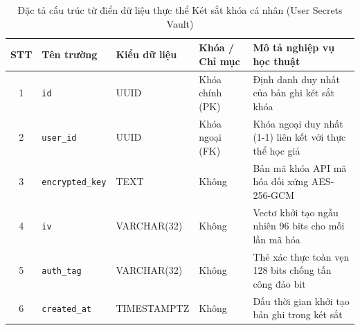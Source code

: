 \begin{table}[htbp]
\centering
\singlespacing
\small
\renewcommand{\arraystretch}{1.2}
\caption{Đặc tả cấu trúc từ điển dữ liệu thực thể Két sắt khóa cá nhân (User Secrets Vault)}
\label{tab:user_secrets}
\setlength{\tabcolsep}{3.5pt}
\begin{tabular}{|c|>{\raggedright\arraybackslash}p{3.4cm}|>{\raggedright\arraybackslash}p{2.9cm}|>{\raggedright\arraybackslash}p{2.2cm}|>{\raggedright\arraybackslash}p{4.3cm}|}
\hline
\textbf{STT} & \centering\textbf{Tên trường} & \centering\textbf{Kiểu dữ liệu} & \centering\textbf{Khóa / Chỉ mục} & \centering\textbf{Mô tả nghiệp vụ học thuật} \tabularnewline \hline
1 & \texttt{id} & UUID & Khóa chính (PK) & Định danh duy nhất của bản ghi két sắt khóa \\ \hline
2 & \texttt{user\_id} & UUID & Khóa ngoại (FK) & Khóa ngoại duy nhất (1-1) liên kết với thực thể học giả \\ \hline
3 & \texttt{encrypted\_key} & TEXT & Không & Bản mã khóa API mã hóa đối xứng AES-256-GCM \\ \hline
4 & \texttt{iv} & VARCHAR(32) & Không & Vectơ khởi tạo ngẫu nhiên 96 bits cho mỗi lần mã hóa \\ \hline
5 & \texttt{auth\_tag} & VARCHAR(32) & Không & Thẻ xác thực toàn vẹn 128 bits chống tấn công đảo bit \\ \hline
6 & \texttt{created\_at} & TIMESTAMPTZ & Không & Dấu thời gian khởi tạo bản ghi trong két sắt \\ \hline
\end{tabular}
\end{table}
